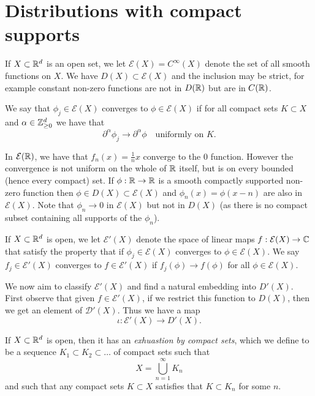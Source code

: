 \documentclass[twoside, a4paper, 10pt]{amsart}
\begin{document}
\section{Distributions with compact supports}

If $X \subset \mathbb{R}^d$ is an open set, we let $\mathcal{E}(X) = C^{\infty}(X)$ denote the set of all smooth functions on $X$. We have $D(X) \subset \mathcal{E}(X)$ and the inclusion may be strict, for example constant non-zero functions are not in $D(\mathbb{R})$ but are in $C(\mathbb{R})$.

\begin{mydef} We say that $\phi_j \in \mathcal{E}(X)$ converges to $\phi \in \mathcal{E}(X)$ if for all compact sets $K \subset X$ and $\alpha \in \mathbb{Z}_{\geq 0}^d$ we have that $$\partial^{\alpha}\phi_j \to \partial^{\alpha}\phi \quad \text{uniformly on } K. $$

\end{mydef}

\begin{eg} In $\mathcal{E}(\mathbb{R})$, we have that $f_n(x) = \frac{1}{n}x$ converge to the $0$ function. However the convergence is not uniform on the whole of $\mathbb{R}$ itself, but is on every bounded (hence every compact) set. If $\phi:\mathbb{R} \to \mathbb{R}$ is a smooth compactly supported non-zero function then $\phi \in D(X) \subset \mathcal{E}(X)$ and $\phi_n(x) = \phi(x-n)$ are also in $\mathcal{E}(X)$. Note that $\phi_n \to 0$ in $\mathcal{E}(X)$ but not in $D(X)$ (as there is no compact subset containing all supports of the $\phi_n$). \end{eg}

\begin{mydef} If $X \subset \mathbb{R}^d$ is open, we let $\mathcal{E}'(X)$ denote the space of linear maps $f:\mathcal{E}(X) \to \mathbb{C}$ that satisfy the property that if $\phi_j \in \mathcal{E}(X)$ converges to $\phi \in \mathcal{E}(X)$. We say $f_j \in \mathcal{E}'(X)$ converges to $f \in \mathcal{E}'(X)$ if $f_j(\phi) \to f(\phi)$ for all $\phi \in \mathcal{E}(X)$.

\end{mydef}

We now aim to classify $\mathcal{E}'(X)$ and find a natural embedding into $D'(X)$. First observe that given $f \in \mathcal{E}'(X)$, if we restrict this function to $D(X)$, then we get an element of $\mathcal{D}'(X)$. Thus we have a map $$\iota:\mathcal{E}'(X) \to D'(X).$$

\begin{lemma} If $X \subset \mathbb{R}^d$ is open, then it has an \textit{exhuastion by compact sets}, which we define to be a sequence $K_1 \subset K_2 \subset \ldots$ of compact sets such that $$X = \bigcup_{n=1}^{\infty} K_n$$ and such that any compact sets $K \subset X$ satisfies that $K \subset K_n$ for some $n$.

\end{lemma}
\end{document}
